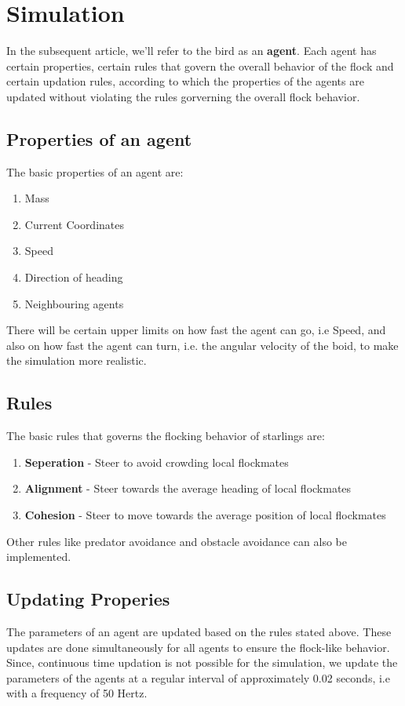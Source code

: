 \documentclass[a4paper,12pt]{article}
\begin{document}
\section{Simulation}
In the subsequent article, we'll refer to the bird as an \textbf{agent}. Each agent has certain properties, certain rules that govern the overall behavior of the flock and certain updation rules, according to which the properties of the agents are updated without violating the rules gorverning the overall flock behavior.

\subsection{Properties of an agent}
The basic properties of an agent are:
\begin{enumerate}
\item Mass
\item Current Coordinates
\item Speed
\item Direction of heading
\item Neighbouring agents
\end{enumerate}
There will be certain upper limits on how fast the agent can go, i.e Speed, and also on how fast the agent can turn, i.e. the angular velocity of the boid, to make the simulation more realistic.

\subsection{Rules}
The basic rules that governs the flocking behavior of starlings are:
\begin{enumerate}
\item\textbf{Seperation} - Steer to avoid crowding local flockmates
\item\textbf{Alignment} - Steer towards the average heading of local flockmates
\item\textbf{Cohesion} - Steer to move towards the average position of local flockmates
\end{enumerate}
Other rules like predator avoidance and obstacle avoidance can also be implemented.
\subsection{Updating Properies}
The parameters of an agent are updated based on the rules stated above. These updates are done simultaneously for all agents to ensure the flock-like behavior.\\
Since, continuous time updation is not possible for the simulation, we update the parameters of the agents at a regular interval of approximately 0.02 seconds, i.e with a frequency of 50 Hertz.
\end{document}
